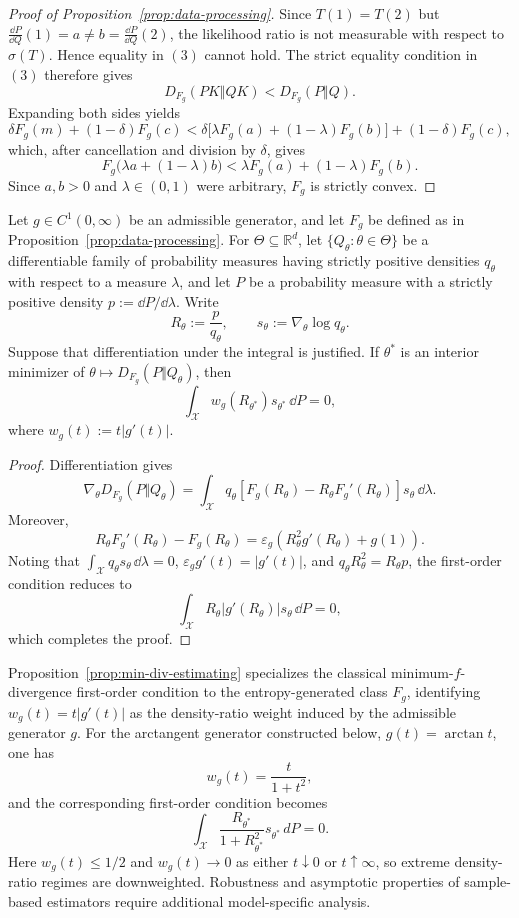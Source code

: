\documentclass[reqno]{amsart}
\begin{document}
\begin{proof}[Proof of Proposition~\ref{prop:data-processing}]
Since $T(1)=T(2)$ but $\frac{\dd P}{\dd Q}(1)=a\neq b
=\frac{\dd P}{\dd Q}(2)$,
the likelihood ratio is not measurable with respect to
$\sigma(T)$. Hence equality in $(3)$ cannot hold. 
The strict equality
condition in $(3)$ therefore gives
$$
D_{F_g}(PK\Vert QK)<D_{F_g}(P\Vert Q).
$$
Expanding both sides yields
$$
\delta F_g(m)+(1-\delta)F_g(c)
<
\delta\bigl[\lambda F_g(a)+(1-\lambda)F_g(b)\bigr]
+(1-\delta)F_g(c),
$$
which, after cancellation and division by $\delta$, gives
$$
F_g\bigl(\lambda a+(1-\lambda)b\bigr)
<
\lambda F_g(a)+(1-\lambda)F_g(b).
$$
Since $a,b>0$ and $\lambda\in(0,1)$ were arbitrary, $F_g$ is strictly
convex.
\end{proof}




\begin{prop}
\label{prop:min-div-estimating}
Let $g\in C^1(0,\infty)$ be an admissible generator, and let $F_g$ be defined as in Proposition~\ref{prop:data-processing}. For $\Theta \subseteq \mathbb{R}^d$, let $\{Q_\theta:\theta \in \Theta\}$ be a differentiable family of
probability measures having strictly positive densities $q_\theta$ with respect to a measure $\lambda$, and let $P$ be a probability measure with a strictly positive density $p:= \dd P/\dd \lambda$. Write
$$
R_\theta:=\frac{p}{q_\theta},
\qquad
s_\theta:=\nabla_\theta\log q_\theta.
$$
Suppose that differentiation under the integral is justified. If
$\theta^\ast$ is an interior minimizer of $\theta\mapsto D_{F_g}(P\Vert Q_\theta)$,
then
$$
\int_{\mathcal X}
w_g(R_{\theta^\ast})s_{\theta^\ast}\,\dd P
=
0,
$$
where $w_g(t):=t|g'(t)|$.
\end{prop}

\begin{proof}
Differentiation gives
$$
\nabla_\theta D_{F_g}(P\Vert Q_\theta)
=
\int_{\mathcal X}
q_\theta
\left[
F_g(R_\theta)
-
R_\theta F_g'(R_\theta)
\right]
s_\theta\,\dd\lambda.
$$
Moreover,
$$
R_\theta F_g'(R_\theta)-F_g(R_\theta)
=
\varepsilon_g
\left(
R_\theta^2g'(R_\theta)+g(1)
\right).
$$
Noting that $\int_{\mathcal X}q_\theta s_\theta\,\dd\lambda=0$, 
$\varepsilon_g g'(t) = |g'(t)|$, and $q_\theta R_\theta^2 = R_\theta p$,
the first-order condition reduces to
$$
\int_{\mathcal X}
R_\theta|g'(R_\theta)|s_\theta\,\dd P
= 0,
$$
which completes the proof.
\end{proof}


Proposition~\ref{prop:min-div-estimating} specializes the classical minimum-$f$-divergence first-order condition to the entropy-generated class $F_g$, identifying
$w_g(t)=t|g'(t)|$ as the density-ratio weight induced by the admissible generator $g$.
For the arctangent generator constructed below, $g(t)=\arctan t$, one has
$$
w_g(t)=\frac{t}{1+t^2},
$$
and the corresponding first-order condition becomes
$$
\int_{\mathcal X}
\frac{R_{\theta^\ast}}{1+R_{\theta^\ast}^2}
s_{\theta^\ast}\,dP = 0.
$$
Here $w_g(t)\leq 1/2$ and $w_g(t)\to0$ as either $t\downarrow0$ or $t\uparrow\infty$, so extreme density-ratio regimes are downweighted.
Robustness and asymptotic properties of sample-based estimators require additional model-specific analysis.
\end{document}
